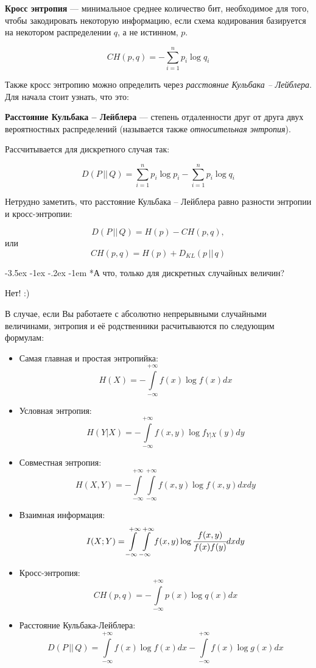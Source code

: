 \documentclass[a4paper, 12pt]{scrreprt}
\makeatletter
\newcommand{\ot}[1]{\textcolor[rgb]{.55,.45,.55}{#1}}
\renewcommand\section{\@startsection{section}{1}{\z@}%
        {-3.5ex \@plus -1ex \@minus -.2ex}%
        {-1em}%
        {\normalfont\large\slshape\bfseries\ot}}
\makeatother
\begin{document}
\begin{siderules}
    \textbf{Кросс энтропия} --- минимальное среднее количество бит, необходимое для того, чтобы закодировать некоторую информацию, если схема кодирования базируется на некотором распределении $q$, а не истинном, $p$.
\end{siderules}

\[CH(p, q)=-\sum\limits_{i=1}^{n}p_i\log q_i \]

Также кросс энтропию можно определить через \textit{расстояние Кульбака -- Лейблера}. Для начала стоит узнать, что это:

\begin{siderules}
    \textbf{Расстояние Кульбака -- Лейблера} --- степень отдаленности друг от друга двух вероятностных распределений (называется также \textit{относительная энтропия}). \end{siderules}
    
    Рассчитывается для дискретного случая так:

    \[D(P\, ||\, Q)=\sum\limits_{i=1}^n p_i\log p_i-\sum\limits_{i=1}^n p_i\log q_i\]

Нетрудно заметить, что расстояние Кульбака -- Лейблера равно разности энтропии и кросс-энтропии:

\[D(P\, ||\, Q)=H(p)-CH(p,q),\]
или
\[CH(p, q)=H(p)+D_{KL}(p\, || \, q)\]

\section*{А что, только для дискретных случайных величин?}~\

Нет! :)

В случае, если Вы работаете с абсолютно непрерывными случайными величинами, энтропия и её родственники расчитываются по следующим формулам:

\begin{itemize}
    \item Самая главная и простая энтропийка:
    \[H(X)=-\int\limits_{-\infty}^{+\infty} f(x)\log f(x)dx \]
    \item Условная энтропия:
    \[H(Y|X)=-\int\limits_{-\infty}^{+\infty} f(x, y)\log f_{Y|X}(y)dy \]
    \item Совместная энтропия:
    \[H(X, Y)=-\int\limits_{-\infty}^{+\infty} \int\limits_{-\infty}^{+\infty} f(x, y)\log f(x, y)dxdy \]
    \item Взаимная информация:
    \[I(X; Y)=\int\limits_{-\infty}^{+\infty} \int\limits_{-\infty}^{+\infty} f(x, y) \log \cfrac{f(x, y)}{f(x)f(y)}dxdy \]
    \item Кросс-энтропия:
    \[CH(p, q)=-\int\limits_{-\infty}^{+\infty}p(x)\log q(x) dx \]
    \item Расстояние Кульбака-Лейблера:
    \[D(P\, ||\, Q)=\int\limits_{-\infty}^{+\infty} f(x)\log f(x)dx -\int\limits_{-\infty}^{+\infty} f(x)\log g(x)dx  \]
\end{itemize}
\end{document}
